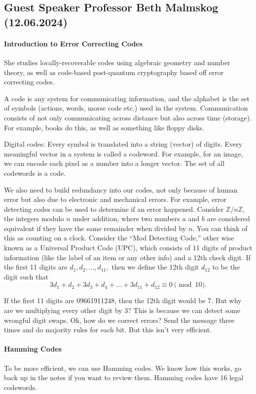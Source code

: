\documentclass[12pt]{article}
\begin{document}
\subsection{Guest Speaker Professor Beth Malmskog (12.06.2024)}
\paragraph{Introduction to Error Correcting Codes}
She studies locally-recoverable codes using algebraic geometry and number theory, as well as code-based post-quantum cryptography based off error correcting codes.

A code is any system for communicating information, and the alphabet is the set of symbols (actions, words, morse code etc.) used in the system. Communication consists of not only communicating across distance but also across time (storage). For example, books do this, as well as something like floppy disks.

Digital codes: Every symbol is translated into a string (vector) of digits. Every meaningful vector in a system is called a codeword. For example, for an image, we can encode each pixel as a number into a longer vector. The set of all codewords is a code.

We also need to build redundancy into our codes, not only because of human error but also due to electronic and mechanical errors. For example, error detecting codes can be used to determine if an error happened. Consider $\mathbb{Z}/n\mathbb{Z},$ the integers modulo $n$ under addition, where two numbers $a$ and $b$ are considered equivalent if they have the same remainder when divided by $n.$ You can think of this as counting on a clock. Consider the ``Mod Detecting Code,'' other wise known as a Universal Product Code (UPC), which consists of 11 digits of product information (like the label of an item or any other info) and a 12th check digit. If the first 11 digits are $d_1,d_2,\dots,d_{11},$ then we define the 12th digit $d_{12}$ to be the digit such that
\[3d_1+d_2+3d_3+d_4+\dots+3d_{11}+d_{12}\equiv 0\pmod{10}.\]

If the first 11 digits are 09661911248, then the 12th digit would be 7. But why are we multiplying every other digit by 3? This is because we can detect some wrongful digit swaps. Ok, how do we correct errors? Send the message three times and do majority rules for each bit. But this isn't very efficient.

\paragraph{Hamming Codes}To be more efficient, we can use Hamming codes. We know how this works, go back up in the notes if you want to review them. Hamming codes have 16 legal codewords.
\end{document}
